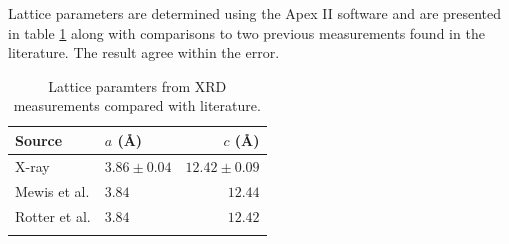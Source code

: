 Lattice parameters are determined using the Apex II software and are presented in table \ref{Table:3:LatticeParams} along with comparisons to two previous measurements found in the literature. The result agree within the error.
\medskip
\begin{table}
    \begin{center}
        \caption{Lattice paramters from XRD measurements compared with literature.}
        \begin{tabular}[h!]{llr}
\toprule
Source  &  $a$ (\AA) & $c$ (\AA) \\
\midrule
X-ray   & $3.86\pm0.04$  & $12.42\pm0.09$ \\
Mewis et al.\cite{Mewis1980} & $3.84$ & $12.44$ \\
Rotter et al.\cite{Rotter2010} & $3.84$ & $12.42$ \\
\bottomrule
        \label{Table:3:LatticeParams}
        \end{tabular}
    \end{center}
\end{table}

